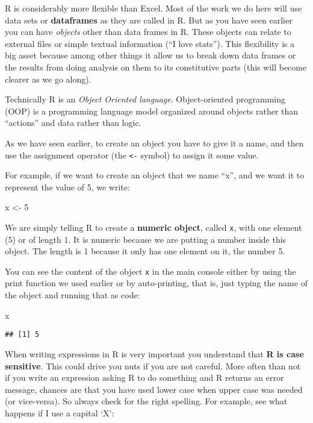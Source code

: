 \documentclass[
]{book}
\newenvironment{Shaded}{\begin{snugshade}}{\end{snugshade}}
\newcommand{\DecValTok}[1]{\textcolor[rgb]{0.00,0.00,0.81}{#1}}
\newcommand{\NormalTok}[1]{#1}
\newcommand{\OtherTok}[1]{\textcolor[rgb]{0.56,0.35,0.01}{#1}}
\begin{document}
R is considerably more flexible than Excel. Most of the work we do here will use data sets or \textbf{dataframes} as they are called in R. But as you have seen earlier you can have \emph{objects} other than data frames in R. These objects can relate to external files or simple textual information (``I love stats''). This flexibility is a big asset because among other things it allow us to break down data frames or the results from doing analysis on them to its constitutive parts (this will become clearer as we go along).

Technically R is an \emph{Object Oriented language}. Object-oriented programming (OOP) is a programming language model organized around objects rather than ``actions'' and data rather than logic.

As we have seen earlier, to create an object you have to give it a name, and then use the assignment operator (the \texttt{\textless{}-} symbol) to assign it some value.

For example, if we want to create an object that we name ``x'', and we want it to represent the value of 5, we write:

\begin{Shaded}
\begin{Highlighting}[]
\NormalTok{x }\OtherTok{\textless{}{-}} \DecValTok{5}
\end{Highlighting}
\end{Shaded}

We are simply telling R to create a \textbf{numeric object}, called \texttt{x}, with one element (5) or of length 1. It is numeric because we are putting a number inside this object. The length is 1 because it only has one element on it, the number 5.

You can see the content of the object \texttt{x} in the main console either by using the print function we used earlier or by auto-printing, that is, just typing the name of the object and running that as code:

\begin{Shaded}
\begin{Highlighting}[]
\NormalTok{x}
\end{Highlighting}
\end{Shaded}

\begin{verbatim}
## [1] 5
\end{verbatim}

When writing expressions in R is very important you understand that \textbf{R is case sensitive}. This could drive you nuts if you are not careful. More often than not if you write an expression asking R to do something and R returns an error message, chances are that you have used lower case when upper case was needed (or vice-versa). So always check for the right spelling. For example, see what happens if I use a capital `X':
\end{document}
